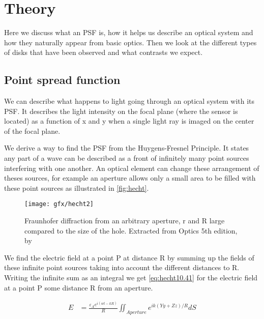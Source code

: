 
\chapter{Theory} %
\label{ch:theory} %
Here we discuss what an \ac{PSF} is, how it helps us describe an optical system and how they naturally appear from basic optics. Then we look at the different types of disks that have been observed and what contrasts we expect.
\section{Point spread function}
\label{sec:PSF}

We can describe what happens to light going through an optical system with its \ac{PSF}. It describes the light intensity on the focal plane (where the sensor is located) as a function of x and y when a single light ray is imaged on the center of the focal plane. 

We derive a way to find the \ac{PSF} from the Huygens-Fresnel Principle. It states any part of a wave can be described as a front of infinitely many point sources interfering with one another. An optical element can change these arrangement of theses sources, for example an aperture allows only a small area to be filled with these point sources as illustrated in \autoref{fig:hecht}. 

\begin{figure}[h]
    \caption{Fraunhofer diffraction from an arbitrary aperture, r and R large compared to the size of the hole. Extracted from Optics 5th edition, by \cite{hecht}}
    \centering
    \texttt{[image: gfx/hecht2]}
    \label{fig:hecht}
\end{figure}

We find the electric field at a point P at distance R by summing up the fields of these infinite point sources taking into account the different distances to R. Writing the infinite sum as an integral we get \autoref{eq:hecht10.41} for the electric field at a point P some distance R from an aperture.

\begin{subequations}
    \begin{align}
        E &= \frac{\varepsilon_A e^{i(wt-kR)}}{R} \iint_{Aperture} e^{ik(Yy+Zz)/R} dS
    \end{align}
    \label{eq:hecht10.41}
\end{subequations}

